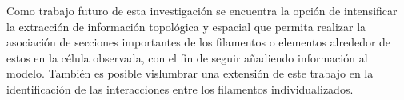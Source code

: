 Como trabajo futuro de esta investigaci\'on se encuentra la opci\'on de intensificar la extracci\'on de informaci\'on topol\'ogica y espacial que permita realizar la asociaci\'on de secciones importantes de los filamentos o elementos alrededor de estos en la c\'elula observada, con el fin de seguir a\~nadiendo informaci\'on al modelo. Tambi\'en es posible vislumbrar una extensi\'on de este trabajo en la identificaci\'on de las interacciones entre los filamentos individualizados. %